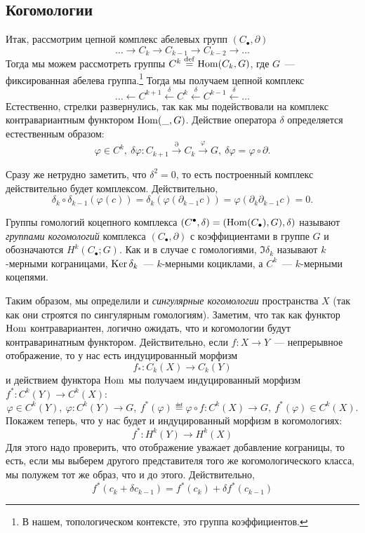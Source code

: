     \subsection{Когомологии}

    Итак, рассмотрим цепной комплекс абелевых групп $(C_{\bullet}, \partial)$
    \[ \ldots \to C_{k} \to C_{k - 1} \to C_{k - 2} \to \ldots \]
    Тогда мы можем рассмотреть группы $C^{k} \eqdef \Hom\lr*{C_{k}, G}$, где $G$~--- фиксированная абелева группа.\footnote{В нашем, топологическом контексте, это группа коэффициентов.}
    Тогда мы получаем цепной комплекс
    \[ \ldots \leftarrow C^{k + 1} \xleftarrow{\delta} C^{k} \xleftarrow{\delta} C^{k - 1} \xleftarrow{\delta} \ldots \]
    Естественно, стрелки развернулись, так как мы подействовали на комплекс контравариантным функтором $\operatorname{Hom}(\_, G)$.
    Действие оператора $\delta$ определяется естественным образом:
    \[ \varphi \in C^{k}, \ \delta\varphi\colon C_{k + 1} \xrightarrow{\partial} C_{k} \xrightarrow{\varphi} G, \ \delta\varphi = \varphi \circ \partial. \]
    \begin{remark}
       Сразу же нетрудно заметить, что $\delta^2 = 0$, то есть построенный комплекс действительно будет комплексом. Действительно,
        \[ \delta_{k} \circ \delta_{k - 1}(\varphi(c)) = \delta_k(\varphi(\partial_{k - 1}c)) = \varphi(\partial_{k}\partial_{k - 1}c) = 0. \]
    \end{remark}

    \begin{definition}
        Группы гомологий коцепного комплекса $(C^{\bullet}, \delta) = (\operatorname{Hom}(C_{\bullet}), G), \delta)$ называют \emph{группами когомологий} комплекса $(C_{\bullet}, \partial)$ с коэффициентами в группе $G$ и обозначаются
    $H^{k}(C_{\bullet}; G)$. Как и в случае с гомологиями, $\Im{\delta_k}$ называют $k$-мерными кограницами, $\operatorname{Ker}{\delta_{k}}$~--- $k$-мерными коциклами, а  $C^k$~--- $k$-мерными коцепями.
    \end{definition}

    Таким образом, мы определили и \emph{сингулярные когомологии} пространства  $X$ (так как они строятся по сингулярным гомологиям).
    Заметим, что так как функтор $\operatorname{Hom}$ контравариантен, логично ожидать, что и когомологии будут контраваринатным функтором. Действительно,
    если $f\colon X \to Y$~--- непрерывное отображение, то у нас есть индуцированный морфизм
    \[ f_{*} \colon C_{k}(X) \to C_{k}(Y) \]
    и действием функтора $\operatorname{Hom}$ мы получаем индуцированный морфизм $f^{*}\colon C^{k}(Y) \to C^{k}(X)$:
    \[  \varphi \in C^{k}(Y), \ \varphi \colon C^{k}(Y) \to G, \ f^{*}(\varphi) \eqdef \varphi \circ f \colon C^{k}(X) \to G, \ f^{*}(\varphi) \in C^{k}(X). \]
    Покажем теперь, что у нас будет и индуцированный морфизм в когомологиях:
    \[ f^{*}\colon H^{k}(Y) \to H^{k}(X) \]
    Для этого надо проверить, что  отображение уважает добавление кограницы, то есть, если мы выберем
    другого представителя того же когомологического класса, мы полужем тот же образ, что и до этого. Действительно,
    \[ f^{*}(c_k + \delta c_{k - 1}) = f^{*}(c_k) + \delta f^{*}(c_{k - 1}) \]

